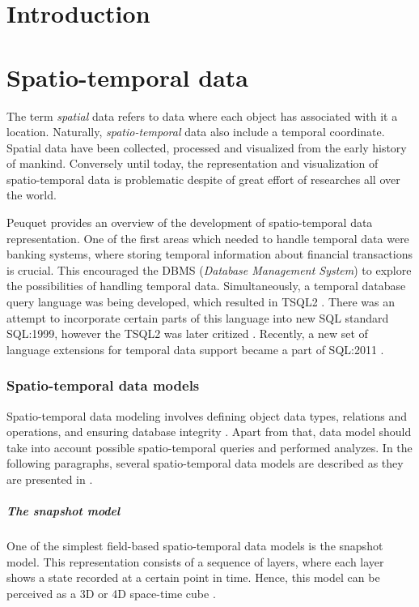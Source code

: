 \documentclass[a4paper,12pt]{book}
\title{}
\author{Anna Kratochvílová}
\begin{document}
\tableofcontents

\chapter{Introduction}

\chapter{Spatio-temporal data}
The term \emph{spatial} data refers to data where each object has associated with it a location.
Naturally, \emph{spatio-temporal} data also include a temporal coordinate.
Spatial data have been collected, processed and visualized from the early history of mankind.
Conversely until today, the representation and visualization of spatio-temporal data
is problematic despite of great effort of researches all over the world.

Peuquet \cite{peuquet2001} provides an overview of the development of spatio-temporal data representation.
One of the first areas which needed to handle temporal data were banking systems,
where storing temporal information about financial transactions is crucial.
This encouraged the DBMS (\emph{Database Management System}) to explore the possibilities of handling
temporal data. Simultaneously, a temporal database query language was being developed, which resulted in TSQL2 \cite{snodgrass1995}.
There was an attempt to incorporate certain parts of this language into new SQL standard SQL:1999,
however the TSQL2 was later critized \cite{darwen2005}.
Recently, a new set of language extensions for temporal data support became a part of
SQL:2011 \cite{kulkarni2012}.

\subsection{Spatio-temporal data models}
Spatio-temporal data modeling involves defining object data types, relations and operations, and ensuring database integrity
\cite{pelekis2004}. Apart from that, data model should take into account possible spatio-temporal queries and performed analyzes.
In the following paragraphs, several spatio-temporal data models are described as they are presented in \cite{pelekis2004}.

\paragraph{The snapshot model}
One of the simplest field-based spatio-temporal data models is the snapshot model.
This representation consists of a sequence of layers,
where each layer shows a state recorded at a certain point in time.
Hence, this model can be perceived as a 3D or 4D space-time cube \cite{peuquet2001}.
\end{document}
